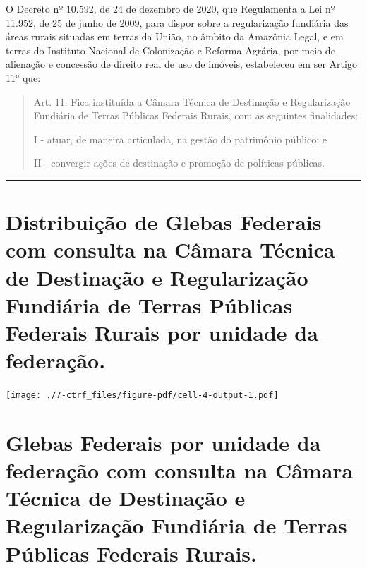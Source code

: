 \documentclass[
  letterpaper,
]{report}
\begin{document}
O Decreto nº 10.592, de 24 de dezembro de 2020, que Regulamenta a Lei nº
11.952, de 25 de junho de 2009, para dispor sobre a regularização
fundiária das áreas rurais situadas em terras da União, no âmbito da
Amazônia Legal, e em terras do Instituto Nacional de Colonização e
Reforma Agrária, por meio de alienação e concessão de direito real de
uso de imóveis, estabeleceu em ser Artigo 11° que:

\begin{quote}
Art. 11. Fica instituída a Câmara Técnica de Destinação e Regularização
Fundiária de Terras Públicas Federais Rurais, com as seguintes
finalidades:

I - atuar, de maneira articulada, na gestão do patrimônio público; e

II - convergir ações de destinação e promoção de políticas públicas.
\end{quote}

\begin{center}\rule{0.5\linewidth}{0.5pt}\end{center}

\hypertarget{distribuiuxe7uxe3o-de-glebas-federais-com-consulta-na-cuxe2mara-tuxe9cnica-de-destinauxe7uxe3o-e-regularizauxe7uxe3o-fundiuxe1ria-de-terras-puxfablicas-federais-rurais-por-unidade-da-federauxe7uxe3o.}{%
\section{Distribuição de Glebas Federais com consulta na Câmara Técnica
de Destinação e Regularização Fundiária de Terras Públicas Federais
Rurais por unidade da
federação.}\label{distribuiuxe7uxe3o-de-glebas-federais-com-consulta-na-cuxe2mara-tuxe9cnica-de-destinauxe7uxe3o-e-regularizauxe7uxe3o-fundiuxe1ria-de-terras-puxfablicas-federais-rurais-por-unidade-da-federauxe7uxe3o.}}

\texttt{[image: ./7-ctrf\_files/figure-pdf/cell-4-output-1.pdf]}

\hypertarget{glebas-federais-por-unidade-da-federauxe7uxe3o-com-consulta-na-cuxe2mara-tuxe9cnica-de-destinauxe7uxe3o-e-regularizauxe7uxe3o-fundiuxe1ria-de-terras-puxfablicas-federais-rurais.}{%
\section{Glebas Federais por unidade da federação com consulta na Câmara
Técnica de Destinação e Regularização Fundiária de Terras Públicas
Federais
Rurais.}\label{glebas-federais-por-unidade-da-federauxe7uxe3o-com-consulta-na-cuxe2mara-tuxe9cnica-de-destinauxe7uxe3o-e-regularizauxe7uxe3o-fundiuxe1ria-de-terras-puxfablicas-federais-rurais.}}
\end{document}
